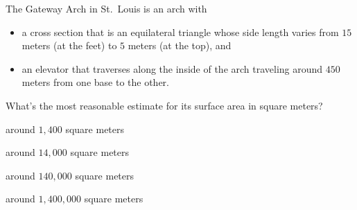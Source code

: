 \documentclass[noauthor,nooutcomes]{ximera}
\begin{document}
\begin{exercise}
 The Gateway Arch in St.\ Louis is an arch with
\begin{itemize}
\item a cross section that is an equilateral triangle whose side
  length varies from $15$ meters (at the feet) to $5$ meters (at the
  top), and
\item an elevator that traverses along the inside of the arch
  traveling around $450$ meters from one base to the other.
\end{itemize}
What's the most reasonable estimate for its surface area in square meters?
\begin{enumerate}\begin{multicols}{2}
  \item around $1,400$ square meters
  \item around $14,000$ square meters
  \item around $140,000$ square meters
  \item around $1,400,000$ square meters
  \end{multicols}
  \end{enumerate}
\end{exercise}





\end{document}
